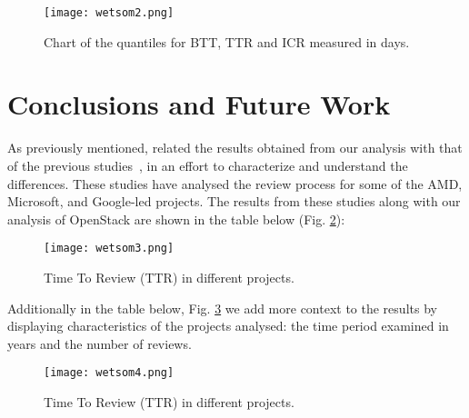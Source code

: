 \documentclass[10pt, conference]{IEEEtran}
\begin{document}
\begin{figure}[H]
\centering

\texttt{[image: wetsom2.png]}

\caption{Chart of the quantiles for BTT, TTR and ICR measured in days.}
\label{fig:2}
\end{figure}

\section{Conclusions and Future Work}


As previously mentioned, related the results obtained from our analysis with 
that of the previous studies~\cite{bib01,bib022}, 
in an effort to characterize and understand the differences. These
studies have analysed the review process for some of
the AMD, Microsoft, and Google-led projects. The results from these studies 
along with our analysis of OpenStack are shown in the table below (Fig. \ref{fig:3}):

\begin{figure}[H]
\centering

\texttt{[image: wetsom3.png]}

\caption{Time To Review (TTR) in  different projects.}
\label{fig:3}
\end{figure}


Additionally in the table below, Fig. \ref{fig:4} we add more context to the results by 
displaying characteristics of the projects analysed: the time period examined in years 
and the number of reviews.

\begin{figure}[H]
\centering

\texttt{[image: wetsom4.png]}

\caption{Time To Review (TTR) in  different projects.}
\label{fig:4}
\end{figure}
\end{document}
